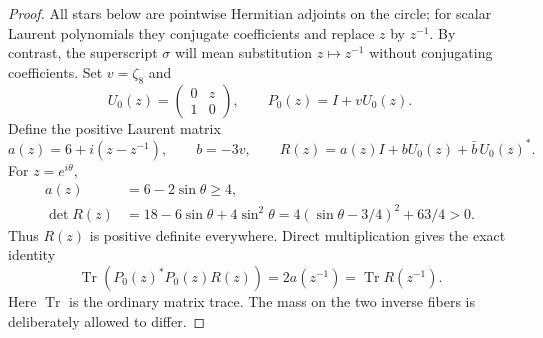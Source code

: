 \documentclass[11pt,a4paper,oneside]{report}
\theoremstyle{definition}
\theoremstyle{remark}
\DeclareMathOperator{\Tr}{Tr}
\begin{document}
\begin{proof}
All stars below are pointwise Hermitian adjoints on the circle;
for scalar Laurent polynomials they conjugate coefficients and
replace $z$ by $z^{-1}$. By contrast, the superscript $\sigma$
will mean substitution $z\mapsto z^{-1}$ without conjugating
coefficients. Set $v=\zeta_8$ and
\[
U_0(z)=\begin{pmatrix}0&z\\1&0\end{pmatrix},
\qquad P_0(z)=I+vU_0(z).
\]
Define the positive Laurent matrix
\begin{equation}\label{M11:circle:covariance}
a(z)=6+i(z-z^{-1}),\qquad b=-3v,\qquad
R(z)=a(z)I+bU_0(z)+\bar b\,U_0(z)^*.
\end{equation}
For $z=e^{i\theta}$,
\begin{align*}
a(z)&=6-2\sin\theta\ge4,\\
\det R(z)&=18-6\sin\theta+4\sin^2\theta
=4(\sin\theta-3/4)^2+63/4>0.
\end{align*}
Thus $R(z)$ is positive definite everywhere. Direct multiplication
gives the exact identity
\begin{equation}\label{M11:circle:trace-transport}
\Tr(P_0(z)^*P_0(z)R(z))
=2a(z^{-1})=\Tr R(z^{-1}).
\end{equation}
Here $\Tr$ is the ordinary matrix trace. The mass on the two
inverse fibers is deliberately allowed to differ.


\end{proof}
\end{document}
